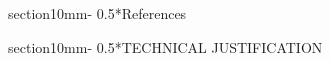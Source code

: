 \documentclass[letterpaper,11pt]{article}
\makeatletter
\renewcommand{\section}{\@startsection%
{section}{1}{0mm}{-\baselineskip}%
{0.5\baselineskip}{\normalfont\Large\bfseries}}%
\makeatother
\begin{document}
\section*{References}

\noindent{}



\section*{TECHNICAL JUSTIFICATION}





\iffalse
\begin{figure}[htp!]
\begin{center}
\hbox{
\hspace{0.5cm}
}
\end{center}
\caption{\footnotesize
{{\it Left panel}: here you see...
{\it Right panel}: here you see...}}
\label{fig1}
\end{figure}
\fi
\end{document}
